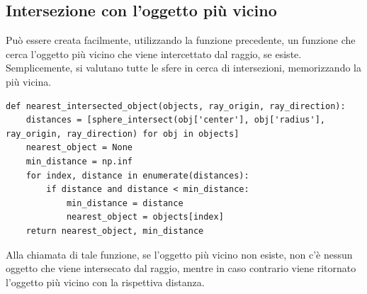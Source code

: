 \documentclass[9pt,a4paper,twoside]{tau}
\begin{document}
\subsection{Intersezione con l'oggetto più vicino}
Può essere creata facilmente, utilizzando la funzione precedente, un funzione che cerca l'oggetto più vicino che viene intercettato dal raggio, se esiste. Semplicemente, si valutano tutte le sfere in cerca di intersezioni, memorizzando la più vicina.
\begin{lstlisting}
def nearest_intersected_object(objects, ray_origin, ray_direction):
    distances = [sphere_intersect(obj['center'], obj['radius'], ray_origin, ray_direction) for obj in objects]
    nearest_object = None
    min_distance = np.inf
    for index, distance in enumerate(distances):
        if distance and distance < min_distance:
            min_distance = distance
            nearest_object = objects[index]
    return nearest_object, min_distance
\end{lstlisting}
Alla chiamata di tale funzione, se l'oggetto più vicino non esiste, non c'è nessun oggetto che viene intersecato dal raggio, mentre in caso contrario viene ritornato l'oggetto più vicino con la rispettiva distanza.
\end{document}

